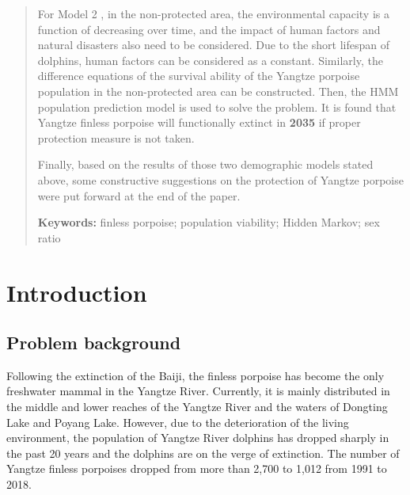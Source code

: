 \documentclass[12pt]{article}  %
\begin{document}
\begin{abstract}
For Model 2 , in the non-protected area, the environmental capacity is a function of decreasing over time, and the impact of human factors and natural disasters also need to be considered. Due to the short lifespan of dolphins, human factors can be considered as a constant. Similarly, the difference equations of the survival ability of the Yangtze porpoise population in the non-protected area can be constructed. Then, the HMM population prediction model is used to solve the problem. It is found that Yangtze finless porpoise will functionally extinct in \textbf{2035} if proper protection measure is not taken.

Finally, based on the results of those two demographic models stated above, some constructive suggestions on the protection of Yangtze porpoise were put forward at the end of the paper.

\noindent%
\textbf{Keywords: }finless porpoise; population viability; Hidden Markov; sex ratio
\end{abstract}
\maketitle  %
\tableofcontents  %



\section{Introduction}%
\subsection{Problem background}%

  Following the extinction of the Baiji, the finless porpoise has become the only freshwater mammal in the Yangtze River. Currently, it is mainly distributed in the middle and lower reaches of the Yangtze River and the waters of Dongting Lake and Poyang Lake. However, due to the deterioration of the living environment, the population of Yangtze River dolphins has dropped sharply in the past 20 years and the dolphins are on the verge of extinction. The number of Yangtze finless porpoises dropped from more than 2,700 to 1,012 from 1991 to 2018. 
\end{document}
